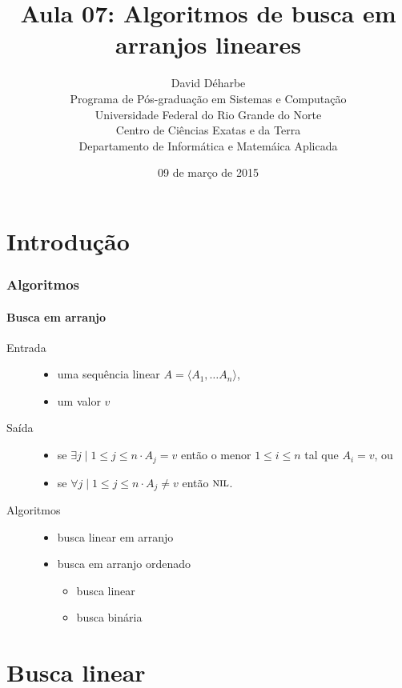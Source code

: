 \documentclass{beamer}
\title{Aula 07: Algoritmos de busca em arranjos lineares}
\author{David Déharbe \\
  Programa de Pós-graduação em Sistemas e Computação \\
  Universidade Federal do Rio Grande do Norte \\
  Centro de Ciências Exatas e da Terra \\
  Departamento de Informática e Matemáica Aplicada}
\date{09 de março de 2015}
\begin{document}
\begin{frame}
  \titlepage
\end{frame}

\section{Introdução}

\begin{frame}

  \frametitle{Algoritmos}
  \framesubtitle{Busca em arranjo}

  \begin{description}
    \item[Entrada]
      \begin{itemize}
        \item uma sequência linear $A = \langle A_1, \dots A_n \rangle$,
        \item um valor $v$
      \end{itemize}
    \item[Saída] 
      \begin{itemize}
        \item se $\exists j \mid 1 \le j \le n \cdot A_j = v$ então o menor $1 \le i \le n$ tal que $A_i = v$, ou
        \item se $\forall j \mid 1 \le j \le n \cdot A_j \neq v$ então $\textnormal{\scshape nil}$.
      \end{itemize}

    \item[Algoritmos]
      \begin{itemize}
      \item busca linear em arranjo 
      \item busca em arranjo ordenado
        \begin{itemize}
        \item busca linear
        \item busca binária
        \end{itemize}
      \end{itemize}

  \end{description}

\end{frame}

\section{Busca linear}
\end{document}
